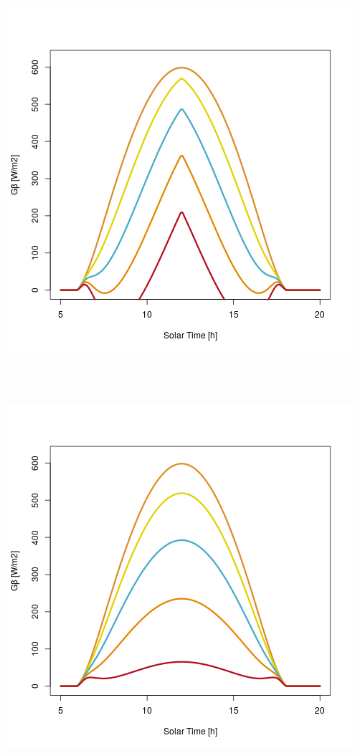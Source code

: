 \begin{figure}[H]
\begin{subfigure}[t]{\subfigureWidth}
  		\includegraphics[height=\graphicsHeight]{sections/martian-environment/plots/diurnal-irradiance-slope-angle-variation-2-for-ls-248-phi-2-tau-05-and-gammac-90.png}
  		\label{fig:sub:irradiance-inclined-gamma-c-m90}
  	\end{subfigure}\\[0.8ex]
    \begin{subfigure}[t]{\subfigureWidth}
      \centering
  		\includegraphics[height=\graphicsHeight]{sections/martian-environment/plots/diurnal-irradiance-slope-angle-variation-3-for-ls-248-phi-2-tau-05-and-gammac-180.png}

\end{subfigure}
\end{figure}
